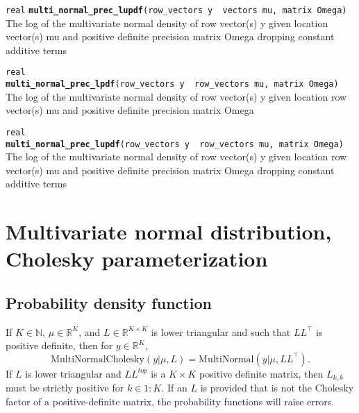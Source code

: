 \documentclass[
  10pt,
]{book}
\begin{document}

\texttt{real} \textbf{\texttt{multi\_normal\_prec\_lupdf}}\texttt{(row\_vectors\ y\ \textbar{}\ vectors\ mu,\ matrix\ Omega)}\newline
The log of the multivariate normal density of row vector(s) y given
location vector(s) mu and positive definite precision matrix Omega
dropping constant additive terms


\texttt{real} \textbf{\texttt{multi\_normal\_prec\_lpdf}}\texttt{(row\_vectors\ y\ \textbar{}\ row\_vectors\ mu,\ matrix\ Omega)}\newline
The log of the multivariate normal density of row vector(s) y given
location row vector(s) mu and positive definite precision matrix Omega


\texttt{real} \textbf{\texttt{multi\_normal\_prec\_lupdf}}\texttt{(row\_vectors\ y\ \textbar{}\ row\_vectors\ mu,\ matrix\ Omega)}\newline
The log of the multivariate normal density of row vector(s) y given
location row vector(s) mu and positive definite precision matrix Omega
dropping constant additive terms

\hypertarget{multi-normal-cholesky-fun}{%
\section{Multivariate normal distribution, Cholesky parameterization}\label{multi-normal-cholesky-fun}}

\hypertarget{probability-density-function-27}{%
\subsection{Probability density function}\label{probability-density-function-27}}

If \(K \in \mathbb{N}\), \(\mu \in \mathbb{R}^K\), and \(L \in \mathbb{R}^{K \times K}\) is lower triangular and such that \(LL^{\top}\)
is positive definite, then for \(y \in \mathbb{R}^K\), \[
\text{MultiNormalCholesky}(y|\mu,L) =
\text{MultiNormal}(y|\mu,LL^{\top}). \] If \(L\) is lower triangular and
\(LL^{top}\) is a \(K \times K\) positive definite matrix, then \(L_{k,k}\)
must be strictly positive for \(k \in 1{:}K\). If an \(L\) is provided
that is not the Cholesky factor of a positive-definite matrix, the
probability functions will raise errors.
\end{document}
